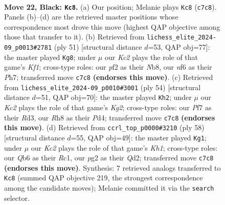 \documentclass[11pt]{article}
\begin{document}
\clearpage

\begin{figure}[p]\centering
\begin{subfigure}{0.46\textwidth}\centering
\resizebox{\linewidth}{!}{%
\newchessgame
\chessboard[
  setfen={r6r/p1k1Qp1p/1qp2N2/8/3p4/3P4/b4PPP/2R3K1 b - - 3 22},
  showmover=false,
  pgfstyle=straightmove, color=movearrow, markmove={c7-c8}
]}
\caption{}
\end{subfigure}\hfill
\begin{subfigure}{0.46\textwidth}\centering
\resizebox{\linewidth}{!}{%
\newchessgame
\chessboard[
  setfen={rnb1qk2/pp5p/4pQp1/2P3N1/8/8/P1P3PP/5R1K b - - 5 26},
  showmover=false,
  pgfstyle=straightmove, color=movearrow, markmove={f8-g8}
]}
\caption{}
\end{subfigure}
\\[4pt]
\begin{subfigure}{0.46\textwidth}\centering
\resizebox{\linewidth}{!}{%
\newchessgame
\chessboard[
  setfen={5rk1/p5pp/8/n2p4/3Pq2P/3R2P1/PPQ3K1/3R4 w - - 3 28},
  showmover=false,
  pgfstyle=straightmove, color=movearrow, markmove={g2-h2}
]}
\caption{}
\end{subfigure}\hfill
\begin{subfigure}{0.46\textwidth}\centering
\resizebox{\linewidth}{!}{%
\newchessgame
\chessboard[
  setfen={1r4k1/5pp1/1P2p2p/r7/1R1PqP2/8/3Q1P1P/2R4K w - - 13 30},
  showmover=false,
  pgfstyle=straightmove, color=movearrow, markmove={h1-g1}
]}
\caption{}
\end{subfigure}
\caption{\textbf{Move 22, Black: \texttt{Kc8}.} (a) Our position; Melanie plays \texttt{Kc8} (\texttt{c7c8}). Panels (b)--(d) are the retrieved master positions whose correspondence most drove this move (highest QAP objective among those that transfer to it). (b) Retrieved from \texttt{lichess\_elite\_2024-09\_p0013\#2781} (ply 51) [structural distance $d$=53, QAP obj=77]: the master played \texttt{Kg8}; under $\mu$ our \emph{Kc2} plays the role of that game's \emph{Kf1}; cross-type roles: our \emph{p}f2 as their \emph{N}b8, our \emph{n}f6 as their \emph{P}h7; transferred move \texttt{c7c8} \textbf{(endorses this move)}. (c) Retrieved from \texttt{lichess\_elite\_2024-09\_p0010\#3001} (ply 54) [structural distance $d$=51, QAP obj=70]: the master played \texttt{Kh2}; under $\mu$ our \emph{Kc2} plays the role of that game's \emph{Kg2}; cross-type roles: our \emph{P}f7 as their \emph{R}d3, our \emph{R}h8 as their \emph{P}d4; transferred move \texttt{c7c8} \textbf{(endorses this move)}. (d) Retrieved from \texttt{ccrl\_top\_p0000\#3210} (ply 58) [structural distance $d$=55, QAP obj=49]: the master played \texttt{Kg1}; under $\mu$ our \emph{Kc2} plays the role of that game's \emph{Kh1}; cross-type roles: our \emph{Q}b6 as their \emph{R}c1, our \emph{p}g2 as their \emph{Q}d2; transferred move \texttt{c7c8} \textbf{(endorses this move)}. Synthesis: 7 retrieved analogs transferred to \texttt{Kc8} (summed QAP objective 219, the strongest correspondence among the candidate moves); Melanie committed it via the \texttt{search} selector.}
\label{fig:thought-m43}
\end{figure}
\end{document}
